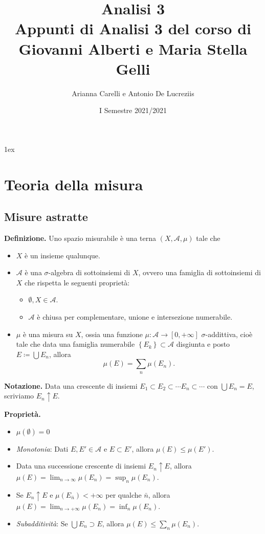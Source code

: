 \documentclass[a4paper, 12pt]{report}
\title{{\Huge Analisi 3}\\{\small Appunti di Analisi 3 del corso di Giovanni Alberti e Maria Stella Gelli}}
\author{Arianna Carelli e Antonio De Lucreziis}
\date{I Semestre 2021/2021}
\begin{document}
%
%
\parskip 1ex
\setlength{\parindent}{0pt}

\maketitle

\tableofcontents
\newpage

\chapter{Teoria della misura}

\section{Misure astratte}

\textbf{Definizione.} 
Uno spazio misurabile è una terna $(X, \mathcal A, \mu)$ tale che
\begin{itemize}
	
	\item $X$ è un insieme qualunque.

	\item $\mathcal{A}$ è una $\sigma$-algebra di sottoinsiemi di $X$, ovvero una famiglia di sottoinsiemi di $X$ che rispetta le seguenti proprietà:
		\begin{itemize}
			\item $\emptyset, X \in \mathcal{A}$.
			\item $\mathcal{A}$ è chiusa per complementare, unione e intersezione numerabile.
		\end{itemize}
	
	\item $\mu$ è una misura su $X$, ossia una funzione $\mu \colon \mathcal A \to [0, +\infty]$ $\sigma$-addittiva, cioè tale che data una famiglia numerabile $\left\{ E_k \right\} \subset \mathcal A$ disgiunta e posto $E \coloneqq \bigcup E_n $, allora
		$$
		\mu(E) = \sum_{n} \mu (E_n).
		$$
\end{itemize}

\textbf{Notazione.}
Data una crescente di insiemi $E_1 \subset E_2 \subset \cdots E_n \subset \cdots$ con $\bigcup E_n = E$, scriviamo $E_n \uparrow E$.

\textbf{Proprietà.}
\begin{itemize}
	\item $\mu(\emptyset) = 0$
	\item \textit{Monotonia}: Dati $E,E' \in \mathcal{A}$ e $E \subset E'$, allora $\mu(E) \leq \mu(E')$.
	\item Data una successione crescente di insiemi $E_n \uparrow E$, allora $\mu(E) = \lim_{n \to \infty} \mu(E_n) = \sup_{n} \mu(E_n)$.
	\item Se $E_n \uparrow E$ e $\mu (E_{\bar{n}}) < +\infty$ per qualche $\bar{n}$, allora $\mu(E) = \lim_{n \to + \infty} \mu(E_n) = \inf_{n} \mu(E_n)$.
	\item \textit{Subadditività}: Se $\bigcup E_n \supset E$, allora $\mu(E) \leq \sum_{n}^{} \mu(E_n)$.
\end{itemize}
\end{document}
